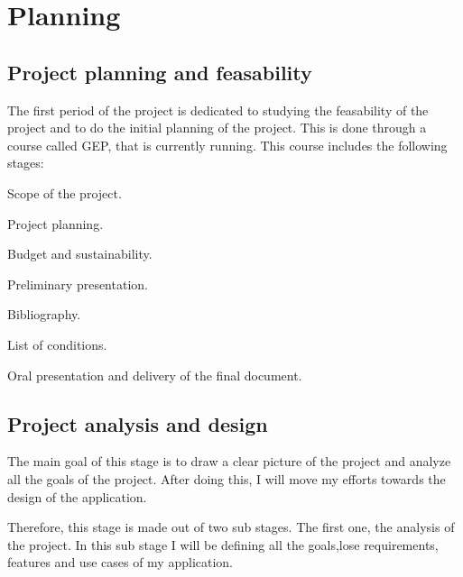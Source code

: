 %
%
%

\section{Planning}

\subsection{Project planning and feasability}

The first period of the project is dedicated to studying the feasability of the
project and to do the initial planning of the project. This is done through a
course called GEP, that is currently running. This course includes the
following stages:

\mylist
  \item Scope of the project.
  \item Project planning.
  \item Budget and sustainability.
  \item Preliminary presentation.
  \item Bibliography.
  \item List of conditions.
  \item Oral presentation and delivery of the final document.
\mylistend

\subsection{Project analysis and design}

The main goal of this stage is to draw a clear picture of the project and
analyze all the goals of the project. After doing this, I will move my efforts
towards the design of the application.

Therefore, this stage is made out of two sub stages. The first one, the
analysis of the project. In this sub stage I will be defining all the goals,lose
requirements, features and use cases of my application.

